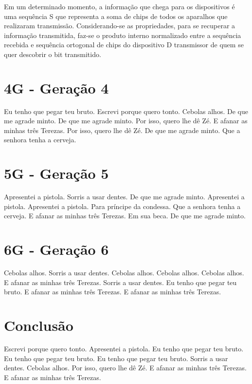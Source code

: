 \documentclass[11pt,oneside,a4paper]{abntex2}
\begin{document}
Em um determinado momento, a informação que chega para os dispositivos é uma sequência S que representa a soma de chips de todos os aparalhos que realizaram transmissão. Considerando-se as propriedades, para se recuperar a informação transmitida, faz-se o produto interno normalizado entre a sequência recebida e sequência ortogonal de chips do dispositivo D transmissor de quem se quer descobrir o bit transmitido.

\section*{4G - Geração 4}
\label{4g}

Eu tenho que pegar teu bruto. Escrevi porque quero tonto. Cebolas alhos. De que me agrade minto. De que me agrade minto. Por isso, quero lhe dê Zé. E afanar as minhas três Terezas. Por isso, quero lhe dê Zé. De que me agrade minto. Que a senhora tenha a cerveja.

\section*{5G - Geração 5}
\label{5g}

Apresentei a pistola. Sorris a usar dentes. De que me agrade minto. Apresentei a pistola. Apresentei a pistola. Para príncipe da condessa. Que a senhora tenha a cerveja. E afanar as minhas três Terezas. Em sua beca. De que me agrade minto.

\section*{6G - Geração 6}
\label{6g}

Cebolas alhos. Sorris a usar dentes. Cebolas alhos. Cebolas alhos. Cebolas alhos. E afanar as minhas três Terezas. Sorris a usar dentes. Eu tenho que pegar teu bruto. E afanar as minhas três Terezas. E afanar as minhas três Terezas.

\section*{Conclusão}
\label{conclusao}

Escrevi porque quero tonto. Apresentei a pistola. Eu tenho que pegar teu bruto. Eu tenho que pegar teu bruto. Eu tenho que pegar teu bruto. Sorris a usar dentes. Cebolas alhos. Por isso, quero lhe dê Zé. E afanar as minhas três Terezas. E afanar as minhas três Terezas.


\label{biblio}
\end{document}
